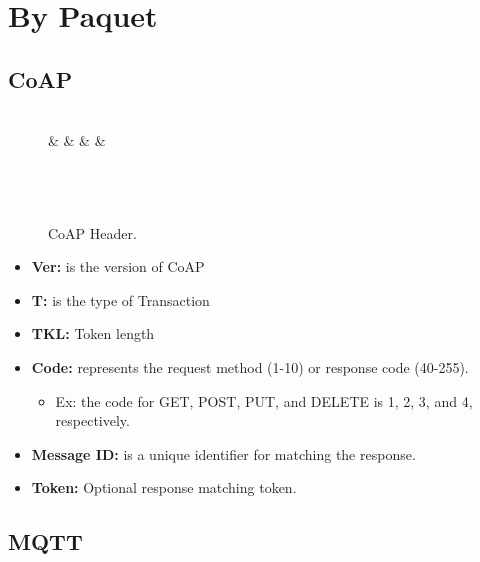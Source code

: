 \section{By Paquet}

\subsection{CoAP}

\begin{figure}[h]
	\footnotesize
	\centering
	\begin{bytefield}[bitwidth=1em]{32}
		                                                     \\
		 &  &  &  & \\
		                                                        \\
		                                                      \\
		                                       \\
	\end{bytefield}
\caption{CoAP Header.}\label{fig:2}
\end{figure}


\begin{itemize}
	\item \textbf{Ver:}  is the version of CoAP
	\item \textbf{T:}  is the type of Transaction
	\item \textbf{TKL:}  Token length
	\item \textbf{Code:} represents the request method (1-10) or response code (40-255).
		\begin{itemize}
			\item Ex: the code for GET, POST, PUT, and DELETE is 1, 2, 3, and 4, respectively.
		\end{itemize}
	\item \textbf{Message ID:} is a unique identifier for matching the response.
	\item \textbf{Token:}  Optional response matching token.
\end{itemize}
	
\subsection{MQTT}

